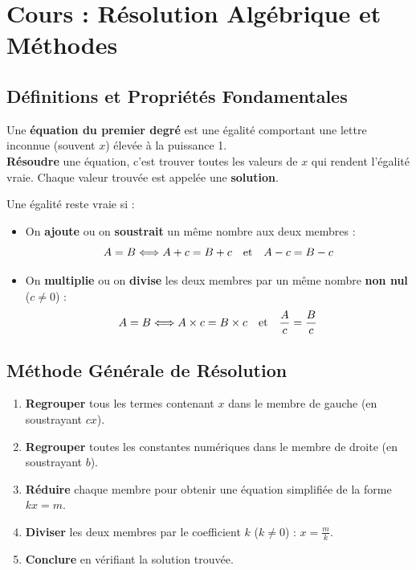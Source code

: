 \section{Cours : Résolution Algébrique et Méthodes}

\subsection{Définitions et Propriétés Fondamentales}

\begin{cadredef}
Une \textbf{équation du premier degré} est une égalité comportant une lettre inconnue (souvent $x$) élevée à la puissance 1. \\
\textbf{Résoudre} une équation, c'est trouver toutes les valeurs de $x$ qui rendent l'égalité vraie. Chaque valeur trouvée est appelée une \textbf{solution}.
\end{cadredef}

\begin{cadreprop}
Une égalité reste vraie si :
\begin{itemize}
    \item On \textbf{ajoute} ou on \textbf{soustrait} un même nombre aux deux membres :
    \[ A = B \Longleftrightarrow A + c = B + c \quad\text{et}\quad A - c = B - c \]
    \item On \textbf{multiplie} ou on \textbf{divise} les deux membres par un même nombre \textbf{non nul} ($c \neq 0$) :
    \[ A = B \Longleftrightarrow A \times c = B \times c \quad\text{et}\quad \frac{A}{c} = \frac{B}{c} \]
\end{itemize}
\end{cadreprop}

\subsection{Méthode Générale de Résolution}

\begin{cadremethode}[Résoudre une équation du type $ax + b = cx + d$]
\begin{enumerate}
    \item \textbf{Regrouper} tous les termes contenant $x$ dans le membre de gauche (en soustrayant $cx$).
    \item \textbf{Regrouper} toutes les constantes numériques dans le membre de droite (en soustrayant $b$).
    \item \textbf{Réduire} chaque membre pour obtenir une équation simplifiée de la forme $k x = m$.
    \item \textbf{Diviser} les deux membres par le coefficient $k$ ($k \neq 0$) : $x = \frac{m}{k}$.
    \item \textbf{Conclure} en vérifiant la solution trouvée.
\end{enumerate}
\end{cadremethode}

